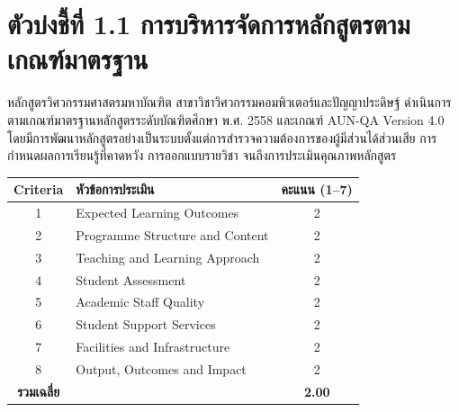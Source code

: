 \section{ตัวบ่งชี้ที่ 1.1 การบริหารจัดการหลักสูตรตามเกณฑ์มาตรฐาน}

หลักสูตรวิศวกรรมศาสตรมหาบัณฑิต สาขาวิชาวิศวกรรมคอมพิวเตอร์และปัญญาประดิษฐ์
ดำเนินการตามเกณฑ์มาตรฐานหลักสูตรระดับบัณฑิตศึกษา พ.ศ. 2558 และเกณฑ์ AUN-QA Version 4.0
โดยมีการพัฒนาหลักสูตรอย่างเป็นระบบตั้งแต่การสำรวจความต้องการของผู้มีส่วนได้ส่วนเสีย
การกำหนดผลการเรียนรู้ที่คาดหวัง การออกแบบรายวิชา จนถึงการประเมินคุณภาพหลักสูตร

\begin{tabularx}{\linewidth}{|c|>{\raggedright\arraybackslash}X|c|}
    \hline
    \rowcolor{gray!15}
    \textbf{Criteria} & \textbf{หัวข้อการประเมิน} & \textbf{คะแนน (1--7)} \\
    \hline
    1 & Expected Learning Outcomes & 2 \\
    \hline
    2 & Programme Structure and Content & 2 \\
    \hline
    3 & Teaching and Learning Approach & 2 \\
    \hline
    4 & Student Assessment & 2 \\
    \hline
    5 & Academic Staff Quality & 2 \\
    \hline
    6 & Student Support Services & 2 \\
    \hline
    7 & Facilities and Infrastructure & 2 \\
    \hline
    8 & Output, Outcomes and Impact & 2 \\
    \hline
    \textbf{รวมเฉลี่ย} & & \textbf{2.00} \\
    \hline
\end{tabularx}
